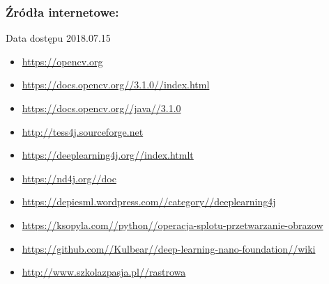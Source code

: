\documentclass[a4paper,12pt]{article}
\begin{document}
	   \subsubsection*{Źródła internetowe:}
	   Data dostępu 2018.07.15
	   \begin{spacing}{1}
	   \begin{itemize}
            \item \href{https://opencv.org}{\url{https://opencv.org}}
            \item \href{https://docs.opencv.org//3.1.0//index.html}{\url{https://docs.opencv.org//3.1.0//index.html}}
            \item \href{https://docs.opencv.org//java//3.1.0}{\url{https://docs.opencv.org//java//3.1.0}}
            
            \item \href{http://tess4j.sourceforge.net}{\url{http://tess4j.sourceforge.net}}
            
            \item \href{https://deeplearning4j.org//index.html}{\url{https://deeplearning4j.org//index.htmlt}}
            \item \href{https://nd4j.org//doc}{\url{https://nd4j.org//doc}}
            \item \href{https://depiesml.wordpress.com//category//deeplearning4j}{\url{https://depiesml.wordpress.com//category//deeplearning4j}}

            \item \href{https://ksopyla.com//python//operacja-splotu-przetwarzanie-obrazow}{\url{https://ksopyla.com//python//operacja-splotu-przetwarzanie-obrazow}}
            \item \href{https://github.com//Kulbear//deep-learning-nano-foundation//wiki//ReLU-and-Softmax-Activation-Functions}{\url{https://github.com//Kulbear//deep-learning-nano-foundation//wiki}}

            \item \href{http://www.szkolazpasja.pl//rastrowa}{\url{http://www.szkolazpasja.pl//rastrowa}}
	   \end{itemize}
	   \end{spacing}
	   
	   
	   
	   

	        
	        
\end{document}
